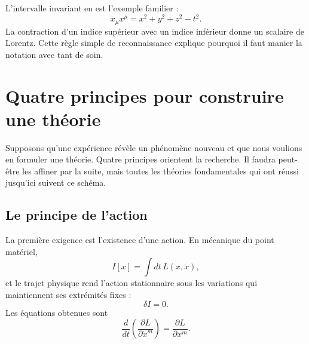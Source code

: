 \begin{classroomqa}
\end{classroomqa}

L’intervalle invariant en est l’exemple familier :
\begin{equation}
x_\mu x^\mu
=
x^2+y^2+z^2-t^2.
\label{eq:sr7-interval}
\end{equation}
La contraction d’un indice supérieur avec un indice inférieur donne un scalaire de Lorentz. Cette règle simple de reconnaissance explique pourquoi il faut manier la notation avec tant de soin.

\section{Quatre principes pour construire une théorie}

Supposons qu’une expérience révèle un phénomène nouveau et que nous voulions en formuler une théorie. Quatre principes orientent la recherche. Il faudra peut-être les affiner par la suite, mais toutes les théories fondamentales qui ont réussi jusqu’ici suivent ce schéma.

\subsection{Le principe de l’action}

La première exigence est l’existence d’une action. En mécanique du point matériel,
\begin{equation}
I[x]
=
\int dt\,L(x,\dot x),
\label{eq:sr7-particle-action-general}
\end{equation}
et le trajet physique rend l’action stationnaire sous les variations qui maintiennent ses extrémités fixes :
\begin{equation}
\delta I=0.
\end{equation}
Les équations obtenues sont
\begin{equation}
\frac{d}{dt}
\left(
\frac{\partial L}{\partial\dot x^m}
\right)
=
\frac{\partial L}{\partial x^m}.
\label{eq:sr7-EL}
\end{equation}


